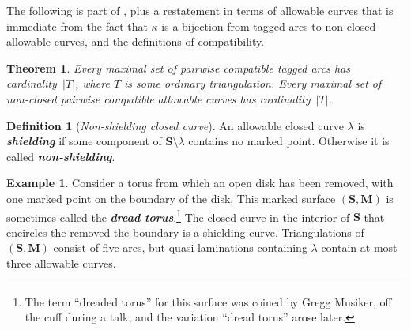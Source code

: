 \documentclass{amsart}
\newtheorem{theorem}[proposition]{Theorem}
\theoremstyle{definition}
\newtheorem{example}[proposition]{Example}
\newtheorem{definition}[proposition]{Definition}
\theoremstyle{remark}
\numberwithin{equation}{section}
\newcommand{\newword}[1]{\textbf{\emph{#1}}}
\newcommand{\0}{{\mathbf{0}}}
\newcommand{\M}{\mathbf{M}}
\renewcommand{\S}{\mathbf{S}}
\begin{document}
The following is part of \cite[Theorem~7.9]{cats1}, plus a restatement in terms of allowable curves that is immediate from the fact that $\kappa$ is a bijection from tagged arcs to non-closed allowable curves, and the definitions of compatibility.

\begin{theorem}\label{card thm}
Every maximal set of pairwise compatible tagged arcs has cardinality~$|T|$, where $T$ is some ordinary triangulation.
Every maximal set of non-closed pairwise compatible allowable curves has cardinality~$|T|$.
\end{theorem}

\begin{definition}[\emph{Non-shielding closed curve}]\label{nonshield def}
An allowable closed curve $\lambda$ is \newword{shielding} if some component of $\S \setminus \lambda$ contains no marked point.
Otherwise it is called \newword{non-shielding}.
\end{definition}

\begin{example}\label{shield ex}
Consider a torus from which an open disk has been removed, with one marked point on the boundary of the disk.
This marked surface $(\S,\M)$ is sometimes called the \newword{dread torus}.\footnote{The term ``dreaded torus'' for this surface was coined by Gregg Musiker, off the cuff during a talk, and the variation ``dread torus'' arose later.}
The closed curve in the interior of $\S$ that encircles the removed  the boundary is a shielding curve.
Triangulations of $(\S,\M)$ consist of five arcs, but quasi-laminations containing $\lambda$ contain at most three allowable curves. 
\end{example}
\end{document}
